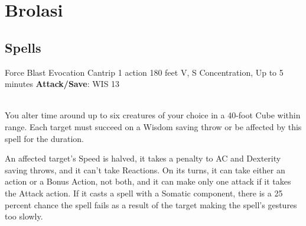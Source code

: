 \chapter*{Brolasi}

\section{Spells}

\DndSpellHeader%
  {Force Blast}
  {Evocation Cantrip}
  {1 action}
  {180 feet}
  {V, S}
  {Concentration, Up to 5 minutes}
  {\textbf{Attack/Save}: WIS 13}\\\
  
  
	You alter time around up to six creatures of your choice in a 40-foot Cube within range. Each target must succeed on a Wisdom saving throw or be affected by this spell for the duration.
	
	An affected target’s Speed is halved, it takes a  penalty to AC and Dexterity saving throws, and it can’t take Reactions. On its turns, it can take either an action or a Bonus Action, not both, and it can make only one attack if it takes the Attack action. If it casts a spell with a Somatic component, there is a 25 percent chance the spell fails as a result of the target making the spell’s gestures too slowly.

